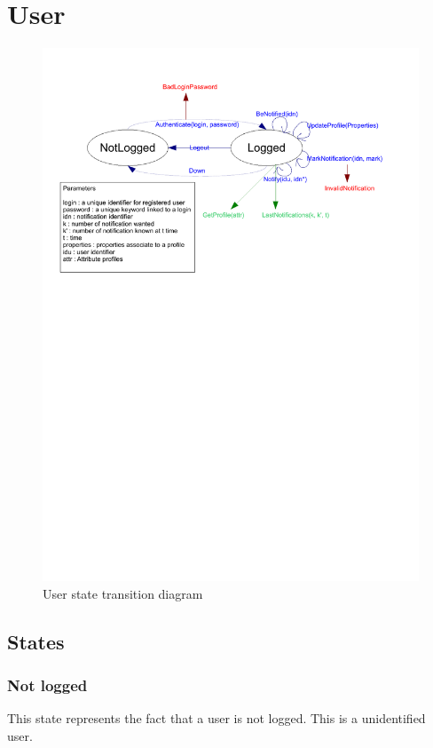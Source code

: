 \section{User}
	\begin{figure}[ht]
			\begin{center}
				\includegraphics[width=\textwidth,  trim=2cm 17cm 2cm 1cm]{UML_figure/state_transition/dojo_logic/st_user.pdf}
				\caption{User state transition diagram}
			\end{center}
	\end{figure}
	\subsection{States}
		\subsubsection{Not logged}
			This state represents the fact that a user is not logged. This is a unidentified user.
